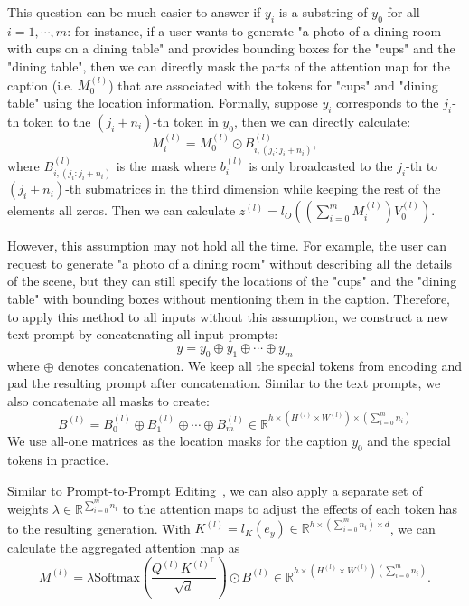 This question can be much easier to answer if $y_i$ is a substring of $y_0$ for all $i = 1,\cdots,m$: for instance, if a user wants to generate "a photo of a dining room with cups on a dining table" and provides bounding boxes for the "cups" and the "dining table", then we can directly mask the parts of the attention map for the caption (i.e. $M_0^{(l)}$) that are associated with the tokens for "cups" and "dining table" using the location information. Formally, suppose $y_i$ corresponds to the $j_i$-th token to the $(j_i + n_i)$-th token in $y_0$, then we can directly calculate: 
\begin{equation}
    M_i^{(l)} = M_0^{(l)}\odot B_{i,(j_i:j_i + n_i)}^{(l)},
\end{equation}
where $ B_{i,(j_i:j_i + n_i)}^{(l)}$ is the mask where $b_i^{(l)}$ is only broadcasted to the $j_i$-th to $(j_i + n_i)$-th submatrices in the third dimension while keeping the rest of the elements all zeros.  
Then we can calculate $z^{(l)} = l_O((\sum_{i=0}^m M_i^{(l)})V_0^{(l)})$.

However, this assumption may not hold all the time. For example, the user can request to generate "a photo of a dining room" without describing all the details of the scene, but they can still specify the locations of the "cups" and the "dining table" with bounding boxes without mentioning them in the caption. Therefore, to apply this method to all inputs without this assumption, we construct a new text prompt by concatenating all input prompts: 
\begin{equation}
    y = y_0 \oplus y_1 \oplus \cdots \oplus y_m
\end{equation}
where $\oplus$ denotes concatenation. We keep all the special tokens from encoding and pad the resulting prompt after concatenation.
Similar to the text prompts, we also concatenate all masks to create:
\begin{equation}
    B^{(l)} = B_{0}^{(l)} \oplus B_{1}^{(l)} \oplus \cdots \oplus B_{m}^{(l)} \in \mathbb{R}^{h\times (H^{(l)} \times W^{(l)}) \times (\sum_{i=0}^m n_i)}
\end{equation}
We use all-one matrices as the location masks for the caption $y_0$ and the special tokens in practice.

Similar to Prompt-to-Prompt Editing~\citep{prompt2prompt}, we can also apply a separate set of weights $\lambda \in \mathbb{R}^{\sum_{i=0}^m n_i}$ to the attention maps to adjust the effects of each token has to the resulting generation. With $K^{(l)} = l_K(e_{y}) \in \mathbb{R}^{h\times (\sum_{i=0}^m n_i) \times d}$, we can calculate the aggregated attention map as
\begin{equation}
    M^{(l)} = \lambda\text{Softmax}(\frac{Q^{(l)}K^{(l)^\top}}{\sqrt{d}}) \odot B^{(l)} \in \mathbb{R}^{h\times (H^{(l)} \times W^{(l)}) (\sum_{i=0}^m n_i)}.
    \label{attn_i}
\end{equation}

